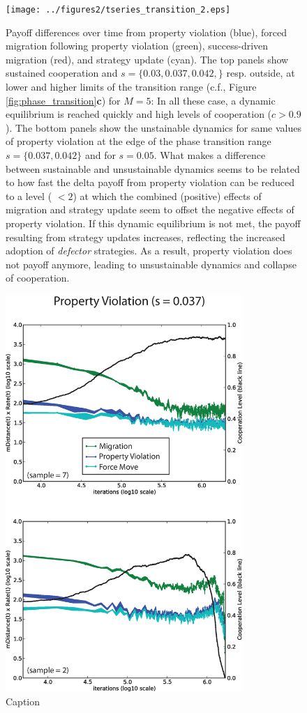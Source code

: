 \begin{figure}[h]
\begin{center}
\centerline{\texttt{[image: ../figures2/tseries\_transition\_2.eps]}}
\caption{Payoff differences over time from property violation (blue), forced migration following property violation (green), success-driven migration (red), and strategy update (cyan). The top panels show sustained cooperation and $s = \{0.03,0.037,0.042,\}$ resp. outside, at lower and higher limits of the transition range (c.f., Figure \ref{fig:phase_transition}{\bf c}) for $M=5$: In all these case, a dynamic equilibrium is reached quickly and high levels of cooperation ($c > 0.9$). The bottom panels show the unstainable dynamics for same values of property violation at the edge of the phase transition range $s = \{0.037,0.042\}$ and for $s = 0.05$. What makes a difference between sustainable and unsustainable dynamics seems to be related to how fast the delta payoff from property violation can be reduced to a level ( $<2$) at which the combined (positive) effects of migration and strategy update seem to offset the negative effects of property violation. If this dynamic equilibrium is not met, the payoff resulting from strategy updates increases, reflecting the increased adoption of {\it defector} strategies. As a result, property violation does not payoff anymore, leading to unsustainable dynamics and collapse of cooperation.}
\label{fig:tseries}
\end{center}
\end{figure}


\begin{figure}[h]
\begin{center}
\centerline{\includegraphics[width=9cm]{../figures2/migration_transition_d05.eps}}
\caption{Caption}
\label{fig:migration_range}
\end{center}
\end{figure}


